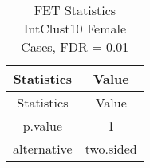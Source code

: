 \documentclass[]{article}
\begin{document}
\begin{longtable}[]{@{}cc@{}}
\caption{FET Statistics IntClust10 Female Cases, FDR =
0.01}\tabularnewline
\toprule
\begin{minipage}[b]{0.18\columnwidth}\centering\strut
Statistics\strut
\end{minipage} & \begin{minipage}[b]{0.14\columnwidth}\centering\strut
Value\strut
\end{minipage}\tabularnewline
\midrule
\endfirsthead
\toprule
\begin{minipage}[b]{0.18\columnwidth}\centering\strut
Statistics\strut
\end{minipage} & \begin{minipage}[b]{0.14\columnwidth}\centering\strut
Value\strut
\end{minipage}\tabularnewline
\midrule
\endhead
\begin{minipage}[t]{0.18\columnwidth}\centering\strut
p.value\strut
\end{minipage} & \begin{minipage}[t]{0.14\columnwidth}\centering\strut
1\strut
\end{minipage}\tabularnewline
\begin{minipage}[t]{0.18\columnwidth}\centering\strut
alternative\strut
\end{minipage} & \begin{minipage}[t]{0.14\columnwidth}\centering\strut
two.sided\strut
\end{minipage}\tabularnewline
\bottomrule
\end{longtable}

\pagebreak
\end{document}
